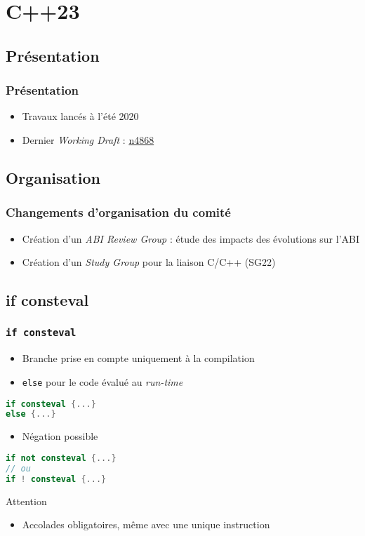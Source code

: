 \documentclass[C++.tex]{subfiles}
\begin{document}
\section{C++23}
\subsection*{Présentation}
\begin{frame}
	\frametitle{Présentation}
	\begin{itemize}
		\item Travaux lancés à l'été 2020
		\item Dernier \textit{Working Draft} : \href{https://github.com/cplusplus/draft/releases/download/n4868/n4868.pdf}{n4868}
	\end{itemize}
\end{frame}

\subsection*{Organisation}
\begin{frame}
	\frametitle{Changements d'organisation du comité}
	\begin{itemize}
		\item Création d'un \textit{ABI Review Group} : étude des impacts des évolutions sur l'ABI
		\item Création d'un \textit{Study Group} pour la liaison C/C++ (SG22)
	\end{itemize}
\end{frame}

\subsection*{if consteval}
\begin{frame}[fragile]
	\frametitle{\lstinline|if consteval|}
	\begin{itemize}
		\item Branche prise en compte uniquement à la compilation
		\item \lstinline|else| pour le code évalué au \textit{run-time}
	\end{itemize}

	\begin{lstlisting}[language=C++]
if consteval {...}
else {...}\end{lstlisting}

	\begin{itemize}
		\item Négation possible
	\end{itemize}

	\begin{lstlisting}[language=C++]
if not consteval {...}
// ou
if ! consteval {...}\end{lstlisting}

	\begin{alertblock}{Attention}
		\begin{itemize}
			\item Accolades obligatoires, même avec une unique instruction
		\end{itemize}
	\end{alertblock}
\end{frame}
\end{document}
